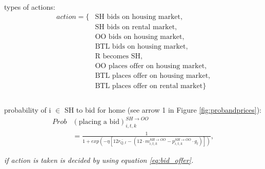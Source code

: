 \documentclass[]{article}
\begin{document}
\\
types of actions:
\begin{equation}\label{eq:action}
	\begin{split}
		action = \{&\text{SH bids on housing market,}\\
		&\text{SH bids on rental market,}\\
		&\text{OO bids on housing market,}\\
		&\text{BTL bids on housing market,}\\
		&\text{R becomes SH,}\\
		&\text{OO places offer on housing market,}\\
		&\text{BTL places offer on housing market,}\\
		&\text{BTL places offer on rental market}\}\\
	\end{split}
\end{equation}
\\
probability of i $\in$ SH to bid for home (see arrow 1 in Figure \ref{fig:probandprices}):
\begin{equation} \label{eq:rent_or_buy}
	\begin{split}
	Prob&(\text{placing a bid})^{SH \rightarrow OO}_{i,t,k} \\
	&= \frac{1}{1+exp(-\eta [12\overline{r_{Q,t}} - (12\cdot m^{SH \rightarrow OO}_{i,t,k} - p^{SH \rightarrow OO}_{i,t,k}\cdot g_{t})])},
	\end{split}
\end{equation}
\begin{center}
	\textit{	if action is taken is decided by using equation \eqref{eq:bid_offer}.}
	\\
\end{center}
\end{document}

